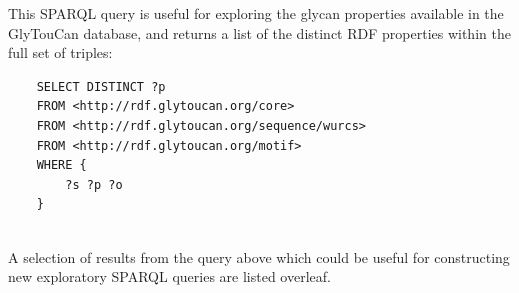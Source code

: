 \documentclass[12pt,a4paper]{article}
\begin{document}
\noindent This SPARQL query is useful for exploring the glycan properties available in the GlyTouCan database, and returns a list of the distinct RDF properties within the full set of triples:

\singlespace
\begin{verbatim}
    SELECT DISTINCT ?p
    FROM <http://rdf.glytoucan.org/core>
    FROM <http://rdf.glytoucan.org/sequence/wurcs>
    FROM <http://rdf.glytoucan.org/motif>
    WHERE {
        ?s ?p ?o
    }
    
\end{verbatim}
\doublespace

\noindent A selection of results from the query above which could be useful for constructing new exploratory SPARQL queries are listed overleaf.\\
\end{document}
